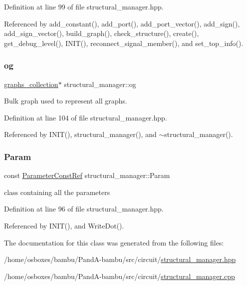 Definition at line 99 of file structural\+\_\+manager.\+hpp.



Referenced by add\+\_\+constant(), add\+\_\+port(), add\+\_\+port\+\_\+vector(), add\+\_\+sign(), add\+\_\+sign\+\_\+vector(), build\+\_\+graph(), check\+\_\+structure(), create(), get\+\_\+debug\+\_\+level(), I\+N\+I\+T(), reconnect\+\_\+signal\+\_\+member(), and set\+\_\+top\+\_\+info().

\mbox{\label{classstructural__manager_a3262e4c848eaa1b32414f80981c524d4}} 
\subsubsection{\texorpdfstring{og}{og}}
{\footnotesize\ttfamily \hyperlink{structgraphs__collection}{graphs\+\_\+collection}$\ast$ structural\+\_\+manager\+::og\hspace{0.3cm}{\ttfamily [private]}}



Bulk graph used to represent all graphs. 



Definition at line 104 of file structural\+\_\+manager.\+hpp.



Referenced by I\+N\+I\+T(), structural\+\_\+manager(), and $\sim$structural\+\_\+manager().

\mbox{\label{classstructural__manager_a4796736ce9b888ff69ba88a37bab2ed1}} 
\subsubsection{\texorpdfstring{Param}{Param}}
{\footnotesize\ttfamily const \hyperlink{Parameter_8hpp_a37841774a6fcb479b597fdf8955eb4ea}{Parameter\+Const\+Ref} structural\+\_\+manager\+::\+Param\hspace{0.3cm}{\ttfamily [private]}}



class containing all the parameters 



Definition at line 96 of file structural\+\_\+manager.\+hpp.



Referenced by I\+N\+I\+T(), and Write\+Dot().



The documentation for this class was generated from the following files\+:\begin{DoxyCompactItemize}
\item 
/home/osboxes/bambu/\+Pand\+A-\/bambu/src/circuit/\hyperlink{structural__manager_8hpp}{structural\+\_\+manager.\+hpp}\item 
/home/osboxes/bambu/\+Pand\+A-\/bambu/src/circuit/\hyperlink{structural__manager_8cpp}{structural\+\_\+manager.\+cpp}\end{DoxyCompactItemize}
